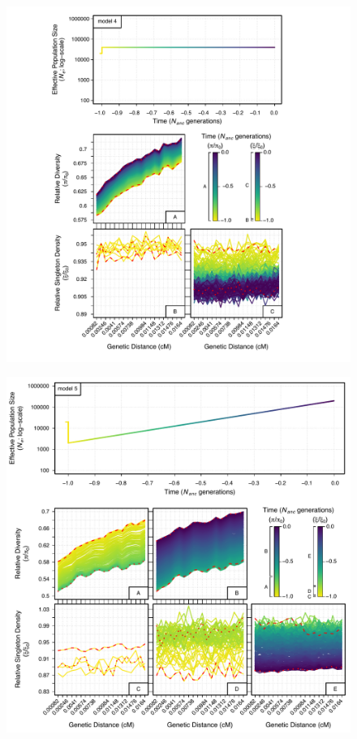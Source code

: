 \documentclass[9pt,twocolumn,twoside]{rilabRxiv}
\begin{document}
\begin{figure}[htb]\ContinuedFloat
    \centering
    \includegraphics[width=\linewidth]{figures/FigS12.pdf}
\end{figure}
\begin{figure}[htb]\ContinuedFloat
    \centering
    \includegraphics[width=\linewidth]{figures/FigS13.pdf}
\end{figure}
\end{document}
